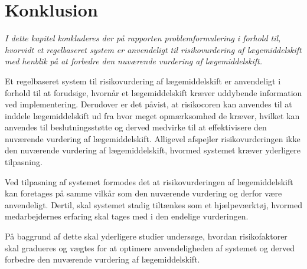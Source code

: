 \chapter{Konklusion}
\textit{I dette kapitel konkluderes der på rapporten problemformulering i forhold til, hvorvidt et regelbaseret system er anvendeligt til risikovurdering af lægemiddelskift med henblik på at forbedre den nuværende vurdering af lægemiddelskift.}

Et regelbaseret system til risikovurdering af lægemiddelskift er anvendeligt i forhold til at forudsige, hvornår et lægemiddelskift kræver uddybende information ved implementering. Derudover er det påvist, at risikocoren kan anvendes til at inddele lægemiddelskift ud fra hvor meget opmærksomhed de kræver, hvilket kan anvendes til beslutningsstøtte og derved medvirke til at effektivisere den nuværende vurdering af lægemiddelskift.
Alligevel afspejler risikovurderingen ikke den nuværende vurdering af lægemiddelskift, hvormed systemet kræver yderligere tilpasning.

Ved tilpasning af systemet formodes det at risikovurderingen af lægemiddelskift kan foretages på samme vilkår som den nuværende vurdering og derfor være anvendeligt. Dertil, skal systemet stadig tiltænkes som et hjælpeværktøj, hvormed medarbejdernes erfaring skal tages med i den endelige vurderingen. 

På baggrund af dette skal yderligere studier undersøge, hvordan risikofaktorer skal gradueres og vægtes for at optimere anvendeligheden af systemet og derved
forbedre den nuværende vurdering af lægemiddelskift.
